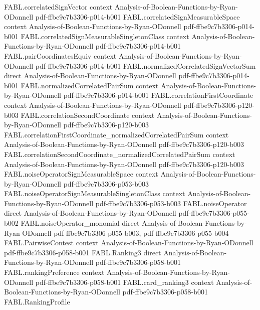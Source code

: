 \begin{theorem}
\proofstep
  {FABL.correlatedSignVector}
  {context}
  {Analysis-of-Boolean-Functions-by-Ryan-ODonnell}
  {pdf-ffbe9c7b3306-p014-b001}
\proofstep
  {FABL.correlatedSignMeasurableSpace}
  {context}
  {Analysis-of-Boolean-Functions-by-Ryan-ODonnell}
  {pdf-ffbe9c7b3306-p014-b001}
\proofstep
  {FABL.correlatedSignMeasurableSingletonClass}
  {context}
  {Analysis-of-Boolean-Functions-by-Ryan-ODonnell}
  {pdf-ffbe9c7b3306-p014-b001}
\proofstep
  {FABL.pairCoordinatesEquiv}
  {context}
  {Analysis-of-Boolean-Functions-by-Ryan-ODonnell}
  {pdf-ffbe9c7b3306-p014-b001}
\proofstep
  {FABL.normalizedCorrelatedSignVectorSum}
  {direct}
  {Analysis-of-Boolean-Functions-by-Ryan-ODonnell}
  {pdf-ffbe9c7b3306-p014-b001}
\proofstep
  {FABL.normalizedCorrelatedPairSum}
  {context}
  {Analysis-of-Boolean-Functions-by-Ryan-ODonnell}
  {pdf-ffbe9c7b3306-p014-b001}
\proofstep
  {FABL.correlationFirstCoordinate}
  {context}
  {Analysis-of-Boolean-Functions-by-Ryan-ODonnell}
  {pdf-ffbe9c7b3306-p120-b003}
\proofstep
  {FABL.correlationSecondCoordinate}
  {context}
  {Analysis-of-Boolean-Functions-by-Ryan-ODonnell}
  {pdf-ffbe9c7b3306-p120-b003}
\proofstep
  {FABL.correlationFirstCoordinate_normalizedCorrelatedPairSum}
  {context}
  {Analysis-of-Boolean-Functions-by-Ryan-ODonnell}
  {pdf-ffbe9c7b3306-p120-b003}
\proofstep
  {FABL.correlationSecondCoordinate_normalizedCorrelatedPairSum}
  {context}
  {Analysis-of-Boolean-Functions-by-Ryan-ODonnell}
  {pdf-ffbe9c7b3306-p120-b003}
\proofstep
  {FABL.noiseOperatorSignMeasurableSpace}
  {context}
  {Analysis-of-Boolean-Functions-by-Ryan-ODonnell}
  {pdf-ffbe9c7b3306-p053-b003}
\proofstep
  {FABL.noiseOperatorSignMeasurableSingletonClass}
  {context}
  {Analysis-of-Boolean-Functions-by-Ryan-ODonnell}
  {pdf-ffbe9c7b3306-p053-b003}
\proofstep
  {FABL.noiseOperator}
  {direct}
  {Analysis-of-Boolean-Functions-by-Ryan-ODonnell}
  {pdf-ffbe9c7b3306-p055-b002}
\proofstep
  {FABL.noiseOperator_monomial}
  {direct}
  {Analysis-of-Boolean-Functions-by-Ryan-ODonnell}
  {pdf-ffbe9c7b3306-p055-b003,
    pdf-ffbe9c7b3306-p055-b004}
\proofstep
  {FABL.PairwiseContest}
  {context}
  {Analysis-of-Boolean-Functions-by-Ryan-ODonnell}
  {pdf-ffbe9c7b3306-p058-b001}
\proofstep
  {FABL.Ranking3}
  {direct}
  {Analysis-of-Boolean-Functions-by-Ryan-ODonnell}
  {pdf-ffbe9c7b3306-p058-b001}
\proofstep
  {FABL.rankingPreference}
  {context}
  {Analysis-of-Boolean-Functions-by-Ryan-ODonnell}
  {pdf-ffbe9c7b3306-p058-b001}
\proofstep
  {FABL.card_ranking3}
  {context}
  {Analysis-of-Boolean-Functions-by-Ryan-ODonnell}
  {pdf-ffbe9c7b3306-p058-b001}
\proofstep
  {FABL.RankingProfile}

\end{theorem}
